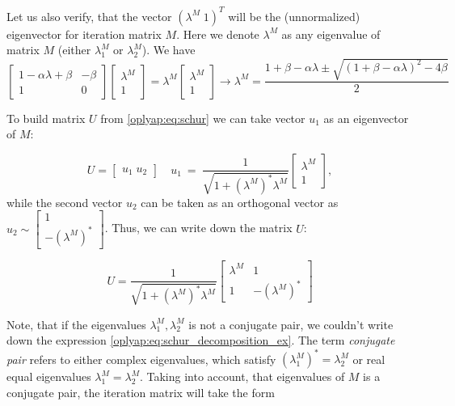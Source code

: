 \documentclass[a4paper,11pt]{article}
\begin{document}
Let us also verify, that the vector $ (\lambda^M \; 1)^T$ will be the (unnormalized) eigenvector for iteration matrix $M$. Here we denote $\lambda^M$ as any eigenvalue of matrix $M$ (either $\lambda^M_1$ or $\lambda^M_2$). We have
\begin{equation*}
 \begin{bmatrix}
 1 - \alpha \lambda + \beta & -\beta \\
 1 & 0
 \end{bmatrix} 
\begin{bmatrix}
 \lambda^M \\ 
 1
 \end{bmatrix} = \lambda^M\begin{bmatrix}
 \lambda^M \\ 
 1
 \end{bmatrix} \to \lambda^M = \dfrac{1+\beta - \alpha \lambda \pm \sqrt{(1+\beta - \alpha\lambda)^2 - 4\beta}}{2}
\end{equation*}

To build matrix $U$ from \eqref{oplyap:eq:schur} we can take vector $u_1$ as an eigenvector of $M$:

\begin{equation}
 U = \begin{bmatrix}
 u_1 \; u_2
 \end{bmatrix}
 \quad
 u_1~=~\dfrac{1}{\sqrt{1 + (\lambda^M)^*\lambda^M}}\begin{bmatrix}
 \lambda^M \\ 1
 \end{bmatrix},
\end{equation}
while the second vector $u_2$ can be taken as an orthogonal vector as $ u_2 \sim \begin{bmatrix}
 1 \\ -(\lambda^M)^*
\end{bmatrix}$. Thus, we can write down the matrix $U$:

\begin{equation}
 U = \dfrac{1}{\sqrt{1 + (\lambda^M)^*\lambda^M}}\begin{bmatrix} \lambda^M & 1 \\ 1 & -(\lambda^M)^* \end{bmatrix}
\end{equation}

Note, that if the eigenvalues $\lambda_1^M, \lambda_2^M$ is not a conjugate pair, we couldn't write down the expression \eqref{oplyap:eq:schur_decomposition_ex}. The term \textit{conjugate pair} refers to either complex eigenvalues, which satisfy $(\lambda_1^M)^* = \lambda_2^M$ or real equal eigenvalues $\lambda_1^M = \lambda_2^M$. Taking into account, that eigenvalues of $M$ is a conjugate pair, the iteration matrix will take the form
\end{document}
